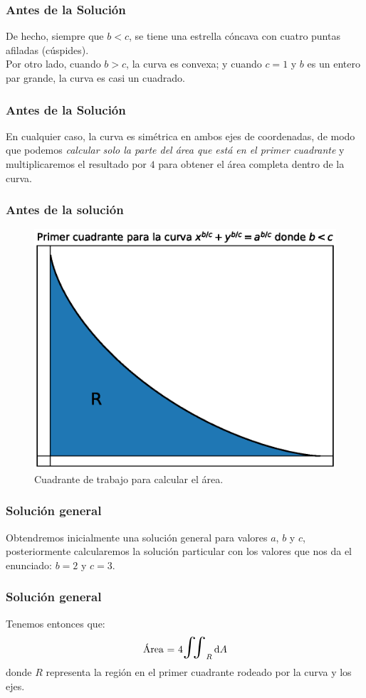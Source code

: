 \documentclass[12pt]{beamer}
\begin{document}
\begin{frame}
\frametitle{Antes de la Solución}
De hecho, siempre que $b < c$, se tiene una estrella cóncava con cuatro puntas afiladas (cúspides).
\\
\bigskip
Por otro lado, cuando $b > c$, la curva es convexa; y cuando $c = 1$ y $b$ es un entero par grande, la curva es casi un cuadrado.
\end{frame}
\begin{frame}
\frametitle{Antes de la Solución}
En cualquier caso, la curva es simétrica en ambos ejes de coordenadas, de modo que podemos \emph{calcular solo la parte del área que está en el primer cuadrante} y multiplicaremos el resultado por $4$ para obtener el área completa dentro de la curva.
\end{frame}
\begin{frame}
\frametitle{Antes de la solución}
\begin{figure}[H]
    \centering
    \includegraphics[scale=0.5]{Imagenes/plot_curva_estrella_02.eps}
    \caption{Cuadrante de trabajo para calcular el área.}
    \label{fig:figura_curva_estrella_cuadrante}
\end{figure}
\end{frame}
\begin{frame}
\frametitle{Solución general}
Obtendremos inicialmente una solución general para valores $a$, $b$ y $c$, posteriormente calcularemos la solución particular con los valores que nos da el enunciado: $b = 2$ y $c = 3$.
\end{frame}
\begin{frame}
\frametitle{Solución general}
Tenemos entonces que:
\pause
\begin{align*}
\text{Área = } 4 \scalebox{2}{$\iint$}_{R} \dd{A}
\end{align*}
donde $R$ representa la región en el primer cuadrante rodeado por la curva y los ejes.
\end{frame}
\end{document}
